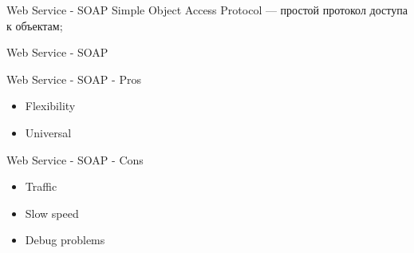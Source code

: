 \begin{frame}{Web Service - SOAP}
Simple Object Access Protocol — простой протокол доступа к объектам;
\end{frame}

\begin{frame}{Web Service - SOAP}
  \begin{center}
    
  \end{center}
\end{frame}

\begin{frame}{Web Service - SOAP - Pros}
    \begin{itemize}
      \item Flexibility
      \item Universal
    \end{itemize}
\end{frame}

\begin{frame}{Web Service - SOAP - Cons}
    \begin{itemize}
      \item Traffic
      \item Slow speed
      \item Debug problems
    \end{itemize}
\end{frame}